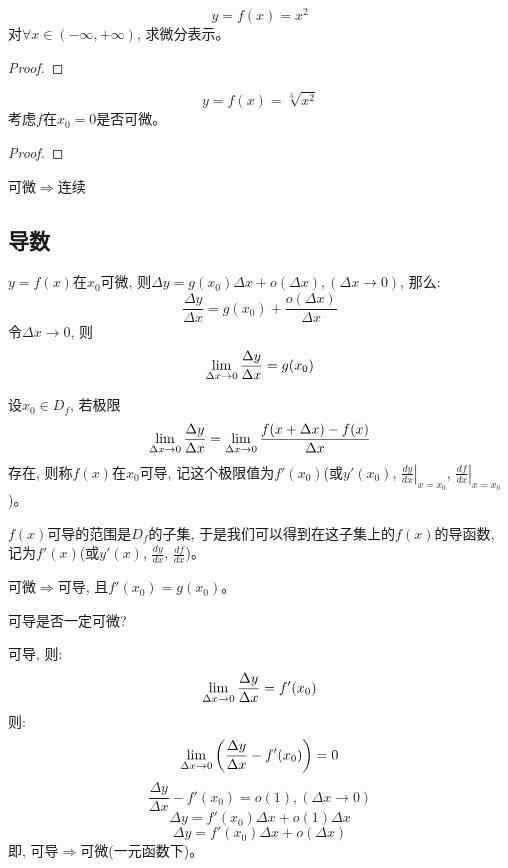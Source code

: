 \documentclass[lang=cn]{elegantbook}
\begin{document}
\begin{proposition}
    \[ y = f(x) = x^2 \]
    对$\forall x \in (-\infty, +\infty)$, 求微分表示。
\end{proposition}
\begin{proof}
    
\end{proof}

\begin{proposition}
    \[ y = f(x) = \sqrt[3]{x^2} \]
    考虑$f$在$x_0 = 0$是否可微。
\end{proposition}
\begin{proof}
    
\end{proof}

可微$\Rightarrow$连续
\subsection{导数}
$y = f(x)$在$x_0$可微, 则$\Delta y = g(x_0)\Delta x + o(\Delta x), (\Delta x \to 0)$, 那么:
\[ \frac{\Delta y}{\Delta x} = g(x_0) + \frac{o(\Delta x)}{\Delta x} \]
令$\Delta x \to 0$, 则
\[ \lim_{\Delta x \to 0 } \frac{\Delta y}{\Delta x} = g(x_0)\]
\begin{definition}
    设$x_0 \in D_f$, 若极限
    \[ \lim_{\Delta x \to 0 } \frac{\Delta y}{\Delta x} = \lim_{\Delta x \to 0 } \frac{f(x+\Delta x) - f(x)}{\Delta x} \]
    存在, 则称$f(x)$在$x_0$可导, 记这个极限值为$f'(x_0)$(或$y'(x_0)$, $\left.\frac{dy}{dx}\right|_{x = x_0}$, $\left.\frac{df}{dx}\right|_{x = x_0}$)。
\end{definition}
$f(x)$可导的范围是$D_f$的子集, 于是我们可以得到在这子集上的$f(x)$的导函数, 记为$f'(x)$(或$y'(x)$, $\frac{dy}{dx}$, $\frac{df}{dx}$)。

可微$\Rightarrow$可导, 且$f'(x_0) = g(x_0)$。

可导是否一定可微?

可导, 则:
\[ \lim_{\Delta x \to 0 } \frac{\Delta y}{\Delta x} = f'(x_0)\]
则:
\[  \lim_{\Delta x \to 0 } \left(\frac{\Delta y}{\Delta x} - f'(x_0) \right) = 0 \]
\[ \frac{\Delta y}{\Delta x} - f'(x_0) = o(1), (\Delta x \to 0) \]
\[ \Delta y = f'(x_0)\Delta x + o(1)\Delta x \]
\[ \Delta y = f'(x_0)\Delta x + o(\Delta x) \]
即, 可导$\Rightarrow$可微(一元函数下)。
\end{document}

